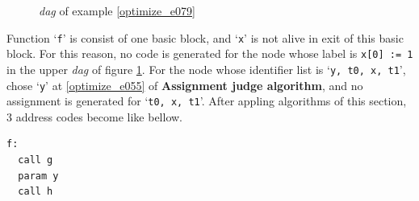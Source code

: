 \begin{Example}
\begin{figure}[htbp]
\begin{center}
\begin{latexonly}
\end{latexonly}
\caption{{\em dag} of example \ref{optimize_e079}}
\label{optimize_e080}
\end{center}
\end{figure}
Function `{\tt{f}}' is consist of one basic block, and 
`{\tt{x}}' is not alive in exit of this basic block.
For this reason, no code is generated
for the node whose label is {\tt{x[0] :=
 1}} in the upper {\em dag} of figure \ref{optimize_e080}.
For the node whose identifier list is `{\tt{y, t0, x, t1}}',
chose `{\tt{y}}' at \ref{optimize_e055} of {\bf Assignment judge
algorithm}, and no assignment is generated for `{\tt{t0, x, t1}}'.
After appling algorithms of this section,
3 address codes become like bellow.
\begin{verbatim}
f:
  call g
  param y
  call h
\end{verbatim}
\end{Example}

